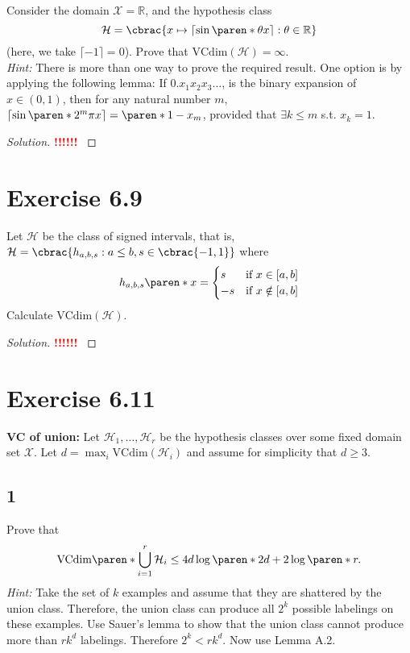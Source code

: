 \documentclass[10pt, a4paper, twoside]{amsart}
\newcommand{\R}{\ensuremath{\mathbb{R}}}
\DeclarePairedDelimiter\cbrac\{\}
\DeclarePairedDelimiter\paren()
\newcommand{\cH}{\ensuremath{\mathcal{H}}}
\newcommand{\cX}{\ensuremath{\mathcal{X}}}
\newenvironment{solution}
               {\let\oldqedsymbol=\qedsymbol
                \renewcommand{\qedsymbol}{$\blacktriangleleft$}
                \begin{proof}[Solution]}
               {\end{proof}
                \renewcommand{\qedsymbol}{\oldqedsymbol}}
\newcommand{\TODO}{\textcolor{red}{\textbf{!!!!!! }}}
\begin{document}
Consider the domain $\cX = \R$, and the hypothesis class
\begin{equation*}
  \cH = \cbrac{x \mapsto \left\lceil \sin\paren*{\theta x} \right\rceil : \theta \in \R }
\end{equation*}
(here, we take $\lceil -1 \rceil = 0$). Prove that $\text{VCdim}(\cH) = \infty$.\\
\textit{Hint:} There is more than one way to prove the required result. One option is by applying the following lemma: If $0 . x_1 x_2 x_3 \ldots$, is the binary expansion of $x \in (0,1)$, then for any natural number $m$, $\lceil \sin \paren*{2^m \pi x} \rceil = \paren*{1-x_m}$, provided that $\exists k \leq m$ s.t. $x_k =1$.
\begin{solution}

\TODO
\end{solution}
\section*{Exercise 6.9}
Let $\cH$ be the class of signed intervals, that is, \\
$\cH = \cbrac{h_{a,b,s}:a \leq b, s \in \cbrac{-1,1}}$ where
\begin{equation*}
  h_{a,b,s}\paren*{x} =
  \begin{cases} 
    s &\mbox{if } x \in [a,b] \\
    -s &\mbox{if } x \notin [a,b]
  \end{cases}
\end{equation*}
Calculate $\text{VCdim}(\cH)$.
\begin{solution}
\TODO
\end{solution}
\section*{Exercise 6.11}
\textbf{VC of union:} Let $\cH_1, \ldots , \cH_r$ be the hypothesis classes over some fixed domain set $\cX$. Let $d = \max_i \text{VCdim}(\cH_i)$ and assume for simplicity that $d \geq 3$.
\subsection*{1}
Prove that
\begin{equation*}
  \text{VCdim}\paren*{\bigcup_{i=1}^r\cH_i}\leq 4d \log \paren*{2d} + 2 \log \paren*{r}.
\end{equation*}
\textit{Hint:} Take the set of $k$ examples and assume that they are shattered by the union class. Therefore, the union class can produce all $2^k$ possible labelings on these examples. Use Sauer's lemma to show that the union class cannot produce more than $rk^d$  labelings. Therefore $2^k < rk^d$. Now use Lemma A.2.
\end{document}
